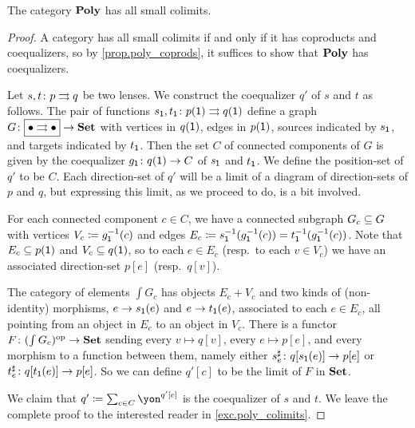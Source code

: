 \documentclass[Book-Poly]{subfiles}
\begin{document}
\begin{theorem}\label{thm.poly_colimits}
The category $\poly$ has all small colimits.
\end{theorem}
\begin{proof}
A category has all small colimits if and only if it has coproducts and coequalizers, so by \cref{prop.poly_coprods}, it suffices to show that $\poly$ has coequalizers.

Let $s,t \colon p \tto q$ be two lenses.
We construct the coequalizer $q'$ of $s$ and $t$ as follows.
The pair of functions $s_\1, t_\1 \colon p(\1) \tto q(\1)$ define a graph $G \colon \fbox{$\bullet\tto\bullet$} \to \smset$ with vertices in $q(\1)$, edges in $p(\1)$, sources indicated by $s_\1$, and targets indicated by $t_\1$.
Then the set $C$ of connected components of $G$ is given by the coequalizer $g_\1 \colon q(\1) \to C$ of $s_\1$ and $t_\1$.
We define the position-set of $q'$ to be $C$.
Each direction-set of $q'$ will be a limit of a diagram of direction-sets of $p$ and $q$, but expressing this limit, as we proceed to do, is a bit involved.


For each connected component $c \in C$, we have a connected subgraph $G_c \ss G$ with vertices $V_c \coloneqq g_\1\inv(c)$ and edges $E_c \coloneqq s_\1\inv(g_\1\inv(c)) = t_\1\inv(g_\1\inv(c))$.
Note that $E_c\ss p(\1)$ and $V_c\ss q(\1)$, so to each $e\in E_c$ (resp.\ to each $v\in V_c$) we have an associated direction-set $p[e]$ (resp.\ $q[v]$).


The category of elements $\int G_c$ has objects $E_c+V_c$ and two kinds of (non-identity) morphisms, $e \to s_\1(e)$ and $e \to t_\1(e)$, associated to each $e \in E_c$, all pointing from an object in $E_c$ to an object in $V_c$.
There is a functor $F \colon (\int G_c)\op \to \smset$ sending every $v \mapsto q[v]$, every $e \mapsto p[e]$, and every morphism to a function between them, namely either $s^\sharp_e \colon q[s_\1(e)] \to p[e]$ or $t^\sharp_e \colon q[t_\1(e)] \to p[e]$.
So we can define $q'[c]$ to be the limit of $F$ in $\smset$.

We claim that $q'\coloneqq\sum_{c\in C}\yon^{q'[c]}$ is the coequalizer of $s$ and $t$. We leave the complete proof to the interested reader in \cref{exc.poly_colimits}.
\end{proof}
\end{document}
